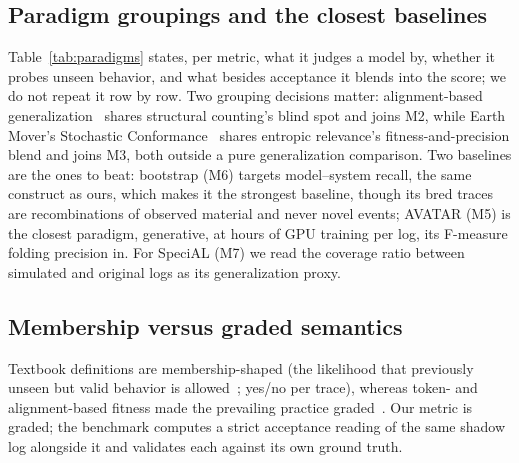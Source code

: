 \documentclass[runningheads]{llncs}
\begin{document}
\subsection{Paradigm groupings and the closest baselines}
Table~\ref{tab:paradigms} states, per metric, what it judges a model by, whether it probes unseen behavior, and what besides acceptance it blends into the score; we do not repeat it row by row. Two grouping decisions matter: alignment-based generalization~\cite{vanderaalst2016pm} shares structural counting's blind spot and joins M2, while Earth Mover's Stochastic Conformance~\cite{leemans2019emsc} shares entropic relevance's fitness-and-precision blend and joins M3, both outside a pure generalization comparison. Two baselines are the ones to beat: bootstrap (M6) targets model--system recall, the same construct as ours, which makes it the strongest baseline, though its bred traces are recombinations of observed material and never novel events; AVATAR (M5) is the closest paradigm, generative, at hours of GPU training per log, its F-measure folding precision in. For SpeciAL (M7) we read the coverage ratio between simulated and original logs as its generalization proxy.

\subsection{Membership versus graded semantics}
Textbook definitions are membership-shaped (the likelihood that previously unseen but valid behavior is allowed~\cite{vanderaalst2016pm}; yes/no per trace), whereas token- and alignment-based fitness made the prevailing practice graded~\cite{rozinat2008conformance}. Our metric is graded; the benchmark computes a strict acceptance reading of the same shadow log alongside it and validates each against its own ground truth.
\end{document}
